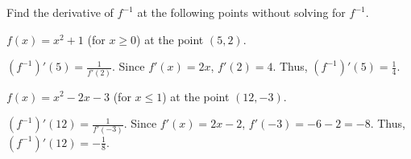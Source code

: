 \documentclass[handout,nooutcomes]{ximera}
\renewenvironment{freeResponse}{
\ifhandout\setbox0\vbox\bgroup\else
\begin{trivlist}\item[\hskip \labelsep\bfseries Solution:\hspace{2ex}]
\fi}
{\ifhandout\egroup\else
\end{trivlist}
\fi}
\begin{document}
\begin{problem}
Find the derivative of $f^{-1}$ at the following points without solving for $f^{-1}$.
	\begin{enumerate}
	
	\item  $f(x) = x^2 + 1$ (for $x \geq 0$) at the point $(5,2)$.  
		\begin{freeResponse}
		$(f^{-1})'(5) = \frac{1}{f'(2)}$.  Since $f'(x) = 2x$, $f'(2) = 4$.  Thus, $(f^{-1})'(5) = \frac{1}{4}$.  
		\end{freeResponse}

	\item  $f(x) = x^2 - 2x - 3$ (for $x \leq 1$) at the point $(12, -3)$.  
		\begin{freeResponse}
		$(f^{-1})'(12) = \frac{1}{f'(-3)}$.  Since $f'(x) = 2x - 2$, $f'(-3) = -6 - 2 = -8$.  Thus, $(f^{-1})'(12) = - \frac{1}{8}$. 
		\end{freeResponse}
	\end{enumerate}
\end{problem}
\end{document}
